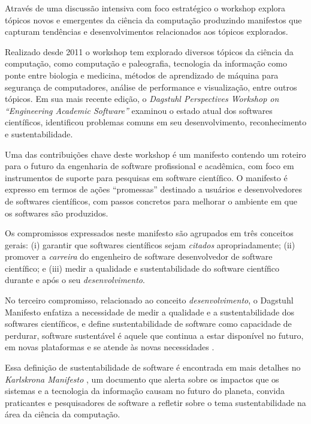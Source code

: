 Através de uma discussão intensiva com foco estratégico o workshop explora
tópicos novos e emergentes da ciência da computação produzindo manifestos que
capturam tendências e desenvolvimentos relacionados aos tópicos explorados.

Realizado desde 2011 o workshop tem explorado diversos tópicos da ciência da
computação, como computação e paleografia, tecnologia da informação como ponte
entre biologia e medicina, métodos de aprendizado de máquina para segurança de
computadores, análise de performance e visualização, entre outros tópicos. Em
sua mais recente edição, o {\it Dagstuhl Perspectives Workshop on ``Engineering
Academic Software''} \cite{allen2017engineering} examinou o estado atual dos
softwares científicos, identificou problemas comuns em seu desenvolvimento,
reconhecimento e sustentabilidade.

Uma das contribuições chave deste workshop é um manifesto contendo um roteiro
para o futuro da engenharia de software profissional e acadêmica, com foco em
instrumentos de suporte para pesquisas em software científico. O manifesto é
expresso em termos de ações ``promessas'' destinado a usuários e
desenvolvedores de softwares científicos, com passos concretos para melhorar o
ambiente em que os softwares são produzidos.

Os compromissos expressados neste manifesto são agrupados em três conceitos gerais:
(i) garantir que softwares científicos sejam {\it citados} apropriadamente;
(ii) promover a {\it carreira} do engenheiro de software desenvolvedor de software científico; e
(iii) medir a qualidade e sustentabilidade do software científico durante e após o seu {\it desenvolvimento}.

No terceiro compromisso, relacionado ao conceito {\it desenvolvimento}, o Dagstuhl Manifesto enfatiza a necessidade de medir a
qualidade e a sustentabilidade dos softwares científicos, e define
sustentabilidade de software como capacidade de perdurar, software sustentável
é aquele que continua a estar disponível no futuro, em novas plataformas e se
atende às novas necessidades \cite{allen2017engineering}.


Essa definição de sustentabilidade de software é encontrada em mais detalhes no
{\it Karlskrona Manifesto} \cite{becker2014karlskrona}, um documento que alerta
sobre os impactos que os sistemas e a tecnologia da informação causam no futuro
do planeta, convida praticantes e pesquisadores de software a refletir sobre
o tema sustentabilidade na área da ciência da computação.

